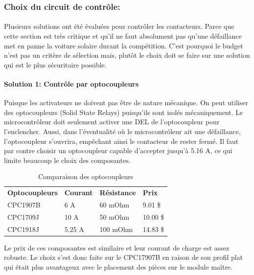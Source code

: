 	\subsubsection*{Choix du circuit de contrôle:}
		\paragraph*{}
		Plusieurs solutions ont été évaluées pour contrôler les contacteurs. Parce que cette section est très critique et qu'il ne faut absolument pas qu'une défaillance met en panne la voiture solaire durant la compétition. C'est pourquoi le budget n'est pas un critère de sélection mais, plutôt le choix doit se faire sur une solution qui est le plus sécuritaire possible.

		\paragraph*{Solution 1: Contrôle par optocoupleurs}
			
		Puisque les activateurs ne doivent pas être de nature mécanique. On peut utiliser des optocoupleurs (Solid State Relays) puisqu'ils sont isolés mécaniquement. Le microcontrôleur doit seulement activer une DEL de l'optocoupleur pour l'enclencher. Aussi, dans l'éventualité où le microcontrôleur ait une défaillance, l'optocoupleur s'ouvrira, empêchant ainsi le contacteur de rester fermé. Il faut par contre choisir un optocoupleur capable d'accepter jusqu'à 5.16 A, ce qui limite beaucoup le choix des composantes.
		
		\begin{table}[H]
			\centering
			\caption{Comparaison des optocoupleurs}
			\label{ComparaisonOpto}
			\renewcommand{\arraystretch}{1.3}
			\begin{tabular}{|p{3cm}|p{3cm}|p{3cm}|p{3cm}|}
				\hline
				\textbf{Optocoupleurs} & \textbf{Courant} & \textbf{Résistance} & \textbf{Prix}
				\\ \hhline{|=|=|=|=|}
				CPC1907B & 6 A & 60 mOhm & 9.01 \$ \\ \hline
				CPC1709J & 10 A & 50 mOhm & 10.00 \$ \\ \hline
				CPC1918J & 5.25 A &	100 mOhm & 14.83 \$	\\ \hline
			\end{tabular}
		\end{table}
		
		Le prix de ces composantes est similaire et leur courant de charge est assez robuste. Le choix s'est donc faite sur le CPC17907B en raison de son profil plat qui était plus avantageux avec le placement des pièces sur le module maître.
		

